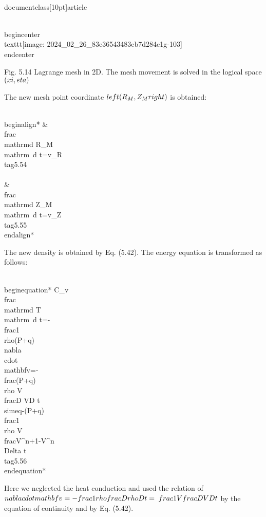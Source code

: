 \\documentclass[10pt]{article}
\begin{document}
{\\begin{center}
\\texttt{[image: 2024\_02\_26\_83e36543483eb7d284c1g-103]}
\\end{center}

Fig. 5.14 Lagrange mesh in 2D. The mesh movement is solved in the logical space $(\\xi, \\eta)$

The new mesh point coordinate $\\left(R_{M}, Z_{M}\\right)$ is obtained:


\\begin{align*}
& \\frac{\\mathrm{d} R_{M}}{\\mathrm{~d} t}=v_{R}  \\tag{5.54}\\\\
& \\frac{\\mathrm{d} Z_{M}}{\\mathrm{~d} t}=v_{Z} \\tag{5.55}
\\end{align*}


The new density is obtained by Eq. (5.42). The energy equation is transformed as follows:


\\begin{equation*}
C_{v} \\frac{\\mathrm{d} T}{\\mathrm{~d} t}=-\\frac{1}{\\rho}(P+q) \\nabla \\cdot \\mathbf{v}=-\\frac{(P+q)}{\\rho V} \\frac{D V}{D t} \\simeq-(P+q) \\frac{1}{\\rho V} \\frac{V^{n+1}-V^{n}}{\\Delta t} \\tag{5.56}
\\end{equation*}


Here we neglected the heat conduction and used the relation of $\\nabla \\cdot \\mathbf{v}=-\\frac{1}{\\rho} \\frac{D \\rho}{D t}=$ $\\frac{1}{V} \\frac{D V}{D t}$ by the equation of continuity and by Eq. (5.42).

}
\end{document}
